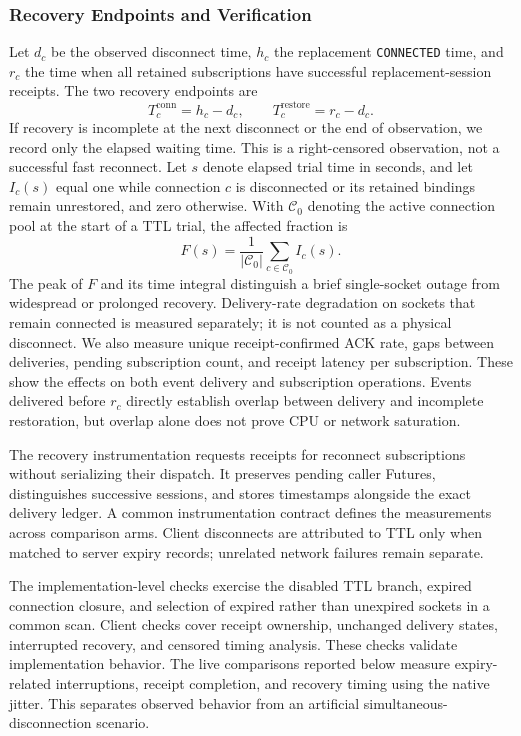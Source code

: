 \subsubsection{Recovery Endpoints and Verification}

Let $d_c$ be the observed disconnect time, $h_c$ the replacement
\texttt{CONNECTED} time, and $r_c$ the time when all retained subscriptions
have successful replacement-session receipts. The two recovery endpoints are
\[
 T_c^{\mathrm{conn}}=h_c-d_c, \qquad T_c^{\mathrm{restore}}=r_c-d_c.
\]
If recovery is incomplete at the next disconnect or the end of observation,
we record only the elapsed waiting time. This is a right-censored observation,
not a successful fast reconnect. Let $s$ denote elapsed trial time in seconds,
and let $I_c(s)$
equal one while connection $c$ is disconnected or its retained bindings remain
unrestored, and zero otherwise. With $\mathcal{C}_0$ denoting the active
connection pool at the start of a TTL trial, the affected fraction is
\[
 F(s)=\frac{1}{|\mathcal{C}_0|}
 \sum_{c\in\mathcal{C}_0} I_c(s).
\]
The peak of $F$ and its time integral distinguish a brief single-socket outage
from widespread or prolonged recovery. Delivery-rate degradation on sockets
that remain connected is measured separately; it is not counted as a physical
disconnect. We also measure unique receipt-confirmed ACK rate, gaps between deliveries,
pending subscription count, and receipt latency per subscription. These show
the effects on both event delivery and subscription operations. Events delivered before $r_c$
directly establish overlap between delivery and incomplete restoration, but
overlap alone does not prove CPU or network saturation.

The recovery instrumentation requests receipts for reconnect subscriptions
without serializing their dispatch. It preserves pending caller Futures,
distinguishes successive sessions, and stores timestamps alongside the exact
delivery ledger. A common instrumentation contract defines the measurements
across comparison arms.
Client disconnects are attributed to TTL only when matched to server expiry
records; unrelated network failures remain separate.

The implementation-level checks exercise the disabled TTL branch, expired
connection closure, and selection of expired rather than unexpired sockets
in a common scan. Client checks cover receipt ownership, unchanged delivery
states, interrupted recovery, and censored timing analysis. These checks
validate implementation behavior. The live comparisons reported below measure
expiry-related interruptions, receipt completion, and recovery timing using
the native jitter. This separates observed behavior from an artificial
simultaneous-disconnection scenario.

